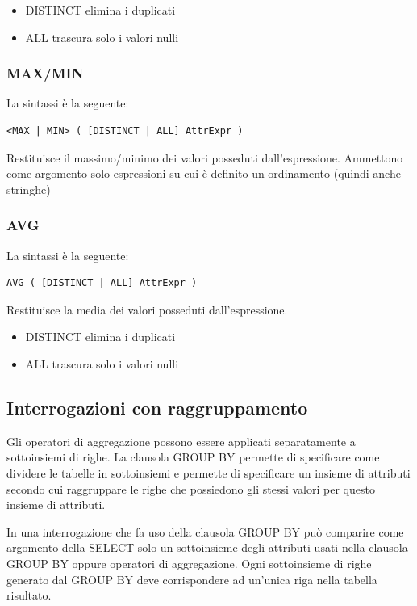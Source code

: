 \documentclass[a4paper,twoside]{article}
\begin{document}
\begin{itemize}
  \item DISTINCT elimina i duplicati
  \item ALL trascura solo i valori nulli
\end{itemize}

\subsubsection{MAX/MIN}
La sintassi è la seguente:
\begin{lstlisting}
<MAX | MIN> ( [DISTINCT | ALL] AttrExpr )
\end{lstlisting}
Restituisce il massimo/minimo dei valori posseduti dall’espressione.
Ammettono come argomento solo espressioni su cui è definito un ordinamento (quindi anche
stringhe)

\subsubsection{AVG}
La sintassi è la seguente:
\begin{lstlisting}
AVG ( [DISTINCT | ALL] AttrExpr )
\end{lstlisting}
Restituisce la media dei valori posseduti dall’espressione.

\begin{itemize}
  \item DISTINCT elimina i duplicati
  \item ALL trascura solo i valori nulli
\end{itemize}


\subsection{Interrogazioni con raggruppamento}
Gli operatori di aggregazione possono essere applicati separatamente a sottoinsiemi di righe.
La clausola GROUP BY permette di specificare come dividere le tabelle in sottoinsiemi e
permette di specificare un insieme di attributi secondo cui raggruppare le righe che possiedono
gli stessi valori per questo insieme di attributi.

\vspace{1em}
\noindent
In una interrogazione che fa uso della clausola GROUP BY può comparire
come argomento della SELECT solo un sottoinsieme degli attributi usati nella
clausola GROUP BY oppure operatori di aggregazione.
Ogni sottoinsieme di righe generato dal GROUP BY deve corrispondere ad un’unica riga nella
tabella risultato.
\end{document}
